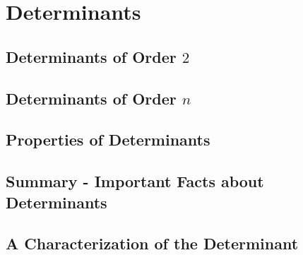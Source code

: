 \setcounter{chapter}{3}
\chapter{Determinants}
\thispagestyle{empty}
\newpage

\section{Determinants of Order $2$}



\vspace{12pt}

\setcounter{Exercise}{10}



\section{Determinants of Order $n$}




\section{Properties of Determinants}



\vspace{12pt}

\setcounter{Exercise}{14}


\vspace{12pt}

\setcounter{Exercise}{20}



\section{Summary - Important Facts about Determinants}


\section{A Characterization of the Determinant}
